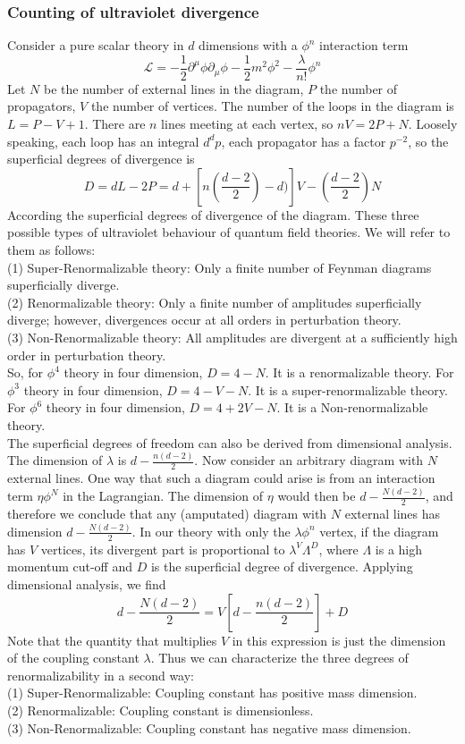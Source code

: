 \documentclass{article}
\begin{document}
\subsubsection{Counting of ultraviolet divergence}
Consider a pure scalar theory in $d$ dimensions with a $\phi^n$ interaction term
\[\mathcal{L} = -\frac{1}{2} \partial^{\mu} \phi \partial_{\mu} \phi -\frac{1}{2}m^2 \phi^2 - \frac{\lambda}{n!}\phi^n\]
Let $N$ be the number of external lines in the diagram, $P$ the number of propagators, $V$ the number of vertices. The number of the loops in the diagram is $L=P-V+1$.  There are $n$ lines meeting at each vertex, so $nV = 2P+N$. Loosely speaking, each loop has an integral $d^d p$, each propagator has a factor $p^{-2}$, so the superficial degrees of divergence is
\[D = dL - 2P = d + [n(\frac{d-2}{2})-d)]V - (\frac{d-2}{2})N\]
According the superficial degrees of divergence of the diagram. These three possible types of ultraviolet behaviour of quantum field theories. We will refer to them as follows:\\
(1) Super-Renormalizable theory: Only a finite number of Feynman diagrams superficially diverge.\\
(2) Renormalizable theory: Only a finite number of amplitudes superficially diverge; however, divergences
occur at all orders in perturbation theory. \\
(3) Non-Renormalizable theory: All amplitudes are divergent at a sufficiently high order in perturbation
theory.\\
So, for $\phi^4$ theory in four dimension, $D = 4 - N$. It is a renormalizable theory. For $\phi^3$ theory in four dimension, $D = 4 - V -N$. It is a super-renormalizable theory. For $\phi^6$ theory in four dimension, $D = 4 + 2V -N$. It is a Non-renormalizable theory. \\
The superficial degrees of freedom can also be derived from dimensional analysis. The dimension of $\lambda$ is $d - \frac{n(d-2)}{2}$. Now consider an arbitrary diagram with $N$ external lines. One way that such a diagram could arise is from an interaction term $\eta \phi^N$ in the Lagrangian. The dimension of $\eta$ would then be $d - \frac{N(d-2)}{2}$, and therefore we conclude that any (amputated) diagram with $N$ external lines has dimension $d - \frac{N(d-2)}{2}$. In our theory with only the $\lambda \phi^n$ vertex, if the diagram has $V$ vertices, its divergent part is proportional to $\lambda^V \Lambda^D$, where $\Lambda$ is a high momentum cut-off and $D$ is the superficial degree of divergence.  Applying dimensional analysis, we find
\[d - \frac{N(d-2)}{2} = V[d - \frac{n(d-2)}{2}] + D\]
Note that the quantity that multiplies $V$ in this expression is just the dimension of the coupling constant $\lambda$. Thus we can characterize the three degrees of renormalizability in a second way:\\
(1) Super-Renormalizable: Coupling constant has positive mass dimension.\\
(2) Renormalizable: Coupling constant is dimensionless.\\
(3) Non-Renormalizable: Coupling constant has negative mass dimension.
\end{document}

